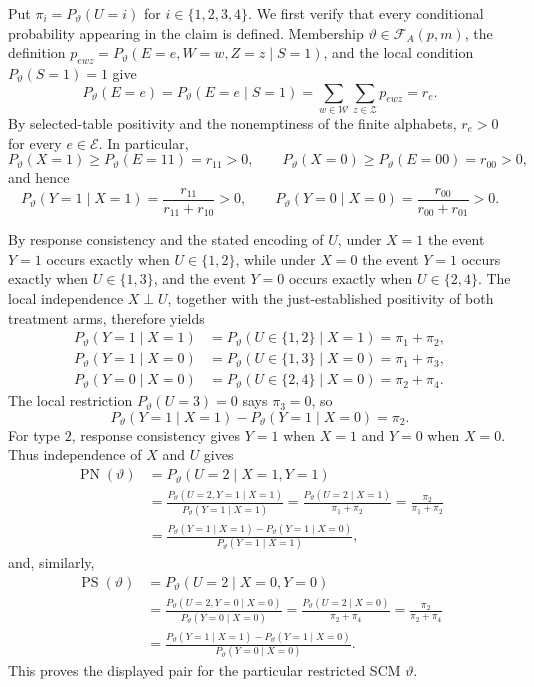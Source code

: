Put \(\pi_i=P_{\vartheta}(U=i)\) for \(i\in\{1,2,3,4\}\).  We first verify that every conditional probability appearing in the claim is defined.  Membership \(\vartheta\in\mathcal F_A(p,m)\), the definition \(p_{ewz}=P_{\vartheta}(E=e,W=w,Z=z\mid S=1)\), and the local condition \(P_{\vartheta}(S=1)=1\) give
\[
 P_{\vartheta}(E=e)
 =P_{\vartheta}(E=e\mid S=1)
 =\sum_{w\in\mathcal W}\sum_{z\in\mathcal Z}p_{ewz}
 =r_e.
\]
By selected-table positivity and the nonemptiness of the finite alphabets, \(r_e>0\) for every \(e\in\mathcal E\).  In particular,
\[
 P_{\vartheta}(X=1)\ge P_{\vartheta}(E=11)=r_{11}>0,
 \qquad
 P_{\vartheta}(X=0)\ge P_{\vartheta}(E=00)=r_{00}>0,
\]
and hence
\[
 P_{\vartheta}(Y=1\mid X=1)
 =\frac{r_{11}}{r_{11}+r_{10}}>0,
 \qquad
 P_{\vartheta}(Y=0\mid X=0)
 =\frac{r_{00}}{r_{00}+r_{01}}>0.
\]

By response consistency and the stated encoding of \(U\), under \(X=1\) the event \(Y=1\) occurs exactly when \(U\in\{1,2\}\), while under \(X=0\) the event \(Y=1\) occurs exactly when \(U\in\{1,3\}\), and the event \(Y=0\) occurs exactly when \(U\in\{2,4\}\).  The local independence \(X\perp U\), together with the just-established positivity of both treatment arms, therefore yields
\[
\begin{aligned}
 P_{\vartheta}(Y=1\mid X=1)
 &=P_{\vartheta}(U\in\{1,2\}\mid X=1)=\pi_1+\pi_2,\\
 P_{\vartheta}(Y=1\mid X=0)
 &=P_{\vartheta}(U\in\{1,3\}\mid X=0)=\pi_1+\pi_3,\\
 P_{\vartheta}(Y=0\mid X=0)
 &=P_{\vartheta}(U\in\{2,4\}\mid X=0)=\pi_2+\pi_4.
\end{aligned}
\]
The local restriction \(P_{\vartheta}(U=3)=0\) says \(\pi_3=0\), so
\[
 P_{\vartheta}(Y=1\mid X=1)-P_{\vartheta}(Y=1\mid X=0)=\pi_2.
\]
For type \(2\), response consistency gives \(Y=1\) when \(X=1\) and \(Y=0\) when \(X=0\).  Thus independence of \(X\) and \(U\) gives
\[
\begin{aligned}
 \operatorname{PN}(\vartheta)
 &=P_{\vartheta}(U=2\mid X=1,Y=1)\\
 &=\frac{P_{\vartheta}(U=2,Y=1\mid X=1)}{P_{\vartheta}(Y=1\mid X=1)}
 =\frac{P_{\vartheta}(U=2\mid X=1)}{\pi_1+\pi_2}
 =\frac{\pi_2}{\pi_1+\pi_2}\\
 &=\frac{P_{\vartheta}(Y=1\mid X=1)-P_{\vartheta}(Y=1\mid X=0)}{P_{\vartheta}(Y=1\mid X=1)},
\end{aligned}
\]
and, similarly,
\[
\begin{aligned}
 \operatorname{PS}(\vartheta)
 &=P_{\vartheta}(U=2\mid X=0,Y=0)\\
 &=\frac{P_{\vartheta}(U=2,Y=0\mid X=0)}{P_{\vartheta}(Y=0\mid X=0)}
 =\frac{P_{\vartheta}(U=2\mid X=0)}{\pi_2+\pi_4}
 =\frac{\pi_2}{\pi_2+\pi_4}\\
 &=\frac{P_{\vartheta}(Y=1\mid X=1)-P_{\vartheta}(Y=1\mid X=0)}{P_{\vartheta}(Y=0\mid X=0)}.
\end{aligned}
\]
This proves the displayed pair for the particular restricted SCM \(\vartheta\).

